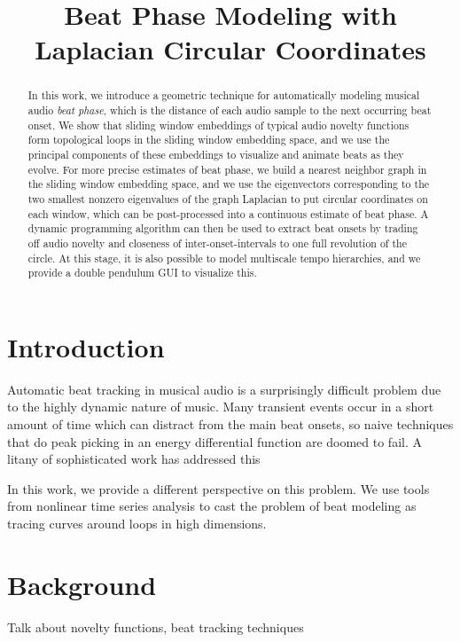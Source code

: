 \documentclass{article}
\title{Beat Phase Modeling with Laplacian Circular Coordinates}
\begin{document}
%
\maketitle
%
\begin{abstract}
In this work, we introduce a geometric technique for automatically modeling musical audio {\em beat phase}, which is the distance of each audio sample to the next occurring beat onset.  We show that sliding window embeddings of typical audio novelty functions form topological loops in the sliding window embedding space, and we use the principal components of these embeddings to visualize and animate beats as they evolve.  For more precise estimates of beat phase, we build a nearest neighbor graph in the sliding window embedding space, and we use the eigenvectors corresponding to the two smallest nonzero eigenvalues of the graph Laplacian to put circular coordinates on each window, which can be post-processed into a continuous estimate of beat phase.  A dynamic programming algorithm can then be used to extract beat onsets by trading off audio novelty and closeness of inter-onset-intervals to one full revolution of the circle.  At this stage, it is also possible to model multiscale tempo hierarchies, and we provide a double pendulum GUI to visualize this.  %
\end{abstract}
%
\section{Introduction}\label{sec:introduction}

Automatic beat tracking in musical audio is a surprisingly difficult problem due to the highly dynamic nature of music.  Many transient events occur in a short amount of time which can distract from the main beat onsets, so naive techniques that do peak picking in an energy differential function are doomed to fail.  A litany of sophisticated work has addressed this

In this work, we provide a different perspective on this problem.  We use tools from nonlinear time series analysis to cast the problem of beat modeling as tracing curves around loops in high dimensions.   

\section{Background}

Talk about novelty functions, beat tracking techniques
\end{document}
